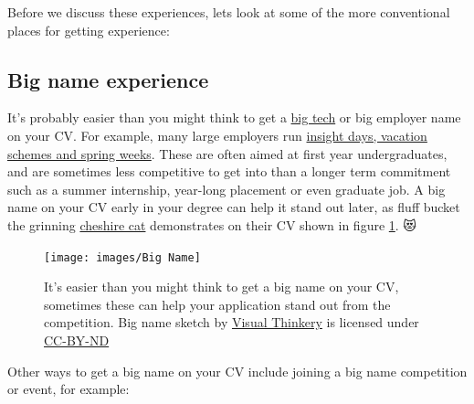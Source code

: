 \documentclass[
]{book}
\begin{document}
Before we discuss these experiences, lets look at some of the more conventional places for getting experience:

\hypertarget{bignames}{%
\subsection{Big name experience}\label{bignames}}

It's probably easier than you might think to get a \href{https://en.wikipedia.org/wiki/Big_Tech}{big tech} or big employer name on your CV. For example, many large employers run \href{https://www.ratemyplacement.co.uk/insights}{insight days, vacation schemes and spring weeks}. These are often aimed at first year undergraduates, and are sometimes less competitive to get into than a longer term commitment such as a summer internship, year-long placement or even graduate job. A big name on your CV early in your degree can help it stand out later, as fluff bucket the grinning \href{https://en.wikipedia.org/wiki/Cheshire_Cat}{cheshire cat} demonstrates on their CV shown in figure \ref{fig:bigname-fig}. 😻

\begin{figure}

{\centering \texttt{[image: images/Big Name]} 

}

\caption{It's easier than you might think to get a big name on your CV, sometimes these can help your application stand out from the competition. Big name sketch by \href{https://visualthinkery.com}{Visual Thinkery} is licensed under \href{https://creativecommons.org/licenses/by-nd/4.0/}{CC-BY-ND}}\label{fig:bigname-fig}
\end{figure}



Other ways to get a big name on your CV include joining a big name competition or event, for example:
\end{document}
